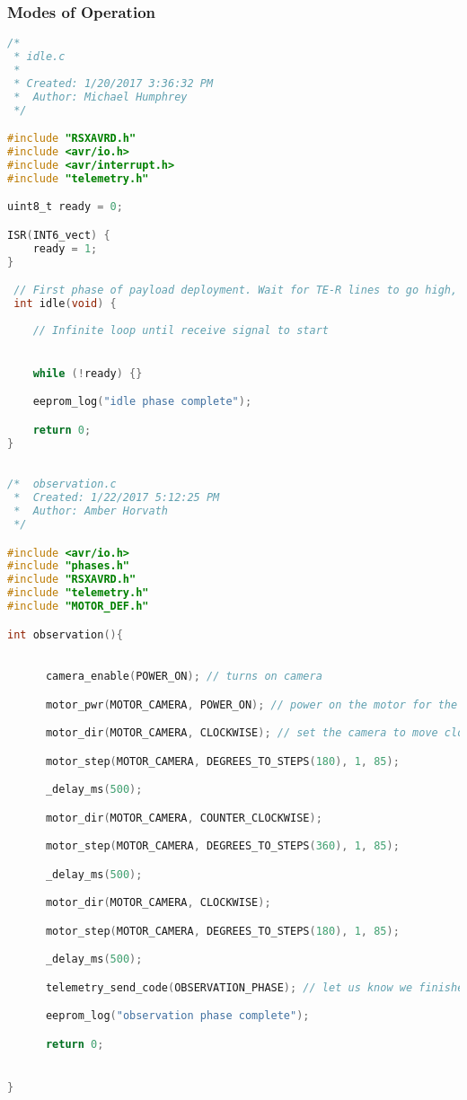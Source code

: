 \subsubsection{Modes of Operation}
\begin{lstlisting}[language=C]
/*
 * idle.c
 *
 * Created: 1/20/2017 3:36:32 PM
 *  Author: Michael Humphrey
 */

#include "RSXAVRD.h"
#include <avr/io.h>
#include <avr/interrupt.h>
#include "telemetry.h"

uint8_t ready = 0;

ISR(INT6_vect) {
	ready = 1;
}

 // First phase of payload deployment. Wait for TE-R lines to go high, then return.
 int idle(void) {
	
	// Infinite loop until receive signal to start


	while (!ready) {}

	eeprom_log("idle phase complete");

	return 0;
}
\end{lstlisting}
\begin{lstlisting}[language=C]

/*  observation.c
 *  Created: 1/22/2017 5:12:25 PM
 *  Author: Amber Horvath
 */

#include <avr/io.h>
#include "phases.h"
#include "RSXAVRD.h"
#include "telemetry.h"
#include "MOTOR_DEF.h"

int observation(){

     
      camera_enable(POWER_ON); // turns on camera

      motor_pwr(MOTOR_CAMERA, POWER_ON); // power on the motor for the camera

      motor_dir(MOTOR_CAMERA, CLOCKWISE); // set the camera to move clockwise

      motor_step(MOTOR_CAMERA, DEGREES_TO_STEPS(180), 1, 85);

      _delay_ms(500);

      motor_dir(MOTOR_CAMERA, COUNTER_CLOCKWISE);

      motor_step(MOTOR_CAMERA, DEGREES_TO_STEPS(360), 1, 85);

      _delay_ms(500);

      motor_dir(MOTOR_CAMERA, CLOCKWISE);

      motor_step(MOTOR_CAMERA, DEGREES_TO_STEPS(180), 1, 85);

      _delay_ms(500); 

      telemetry_send_code(OBSERVATION_PHASE); // let us know we finished Observation mode

      eeprom_log("observation phase complete");

      return 0;


}

\end{lstlisting}

